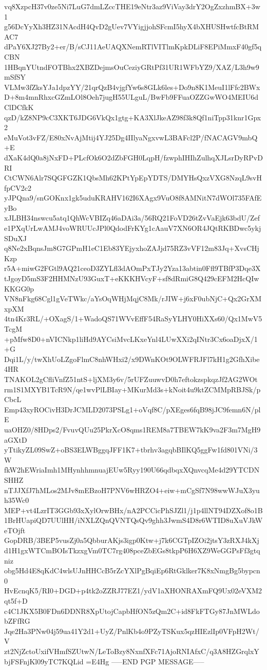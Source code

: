 vq8XzpcH37v0ze5Ni7LuG7dmLZccTHE19eNtr3az9ViVay3drY2OgZxzhmBX+3w1
g56DcYyXh3HZ31NAcdH4QvD2gUev7VYigjjohSFcmI5hyX4bXHUSHwtfcBtRMAC7
dPaY6XJ27By2+er/B/sCJ11AeUAQXNemRTlVITlmKpkDLiF8EPiMmxF40gf5qCBN
1HBqnYUtndFOTBhx2XBZDejmsOuCeziyGRtPf31UR1WFbYZ9/XAZ/L3h9w9mSfSY
VLMw3fZksYJa1dpzYY/21qrQzB4vjgfYw6s8GLk6les+Do9n8K1MeuI1lFfc2BWx
D+8m4mnRhxcGZmLOl8Oeh7jugH55ULguL/BwFb9FFuaOZZGwWO4MEIU6dClDCfkK
qzD/kZ8NP9cC3XKT6JDG6VkQx1gtg+KA3XlJkeAZ98f3k8Qf1niTpp31knr1Gpx2
eMuVot3vFZ/E80xNvAjMtij4YJ25Dg4IIlyaNgxvwL3BAFcl2P/fNACAGV9mbQ+E
dXaK4dQ0a8jNxFD+PLcfOk6O2dZbFGH0LqpH/fzwphIHIhZulhqXJLsrDyRPvDRI
CtCWN6Alr7SQGFGZK1QbsMh62KPtYpEpYDTS/DMYHsQxzVXG8NzqL9svHfpCV2c2
yJPQna9/snGOKnx1gk5uduKRAHV162I6XAgx9VuO8f8AMNitN7dWOl735FAfEyBo
xJLBH34nswcu5atq1QhWcVBIZq46aDAi3a/56RQ21FoVD26tZvVaEjk63bdU/Zef
e1PXqUrLwAMJ4voWRUUcJPl0QdodFrKYg1cAauV7XN6OR4JQtRKBDwc5ykjSDuXJ
q8Ne2xBqnsJm8G7GPmH1eC1Eb83YEjyxhoZAJjd75RZ3vVF12m83Jq+XvsCHjKzp
r5A+miwG2FGtl9AQ21ceoD3ZYLfl3dAOmPxTJy2Yza13abtin0Ffl9TBfP3Dqe3X
tJgoyD5mS3F2HHMNzU93GuxT+eKKKHVcyF+sf8dRmiG8Q429cEFM2HcQIwKKGG0p
VN8nFkg68Cgl1gVeTWkc/aYsOqWHjMqjC8Mk/rJIW+j6xF0ubNjC+Qx2GrXMxpXM
4tn4Kr3RL/+OXagS/1+WadoQS71WVvEffF54RaSyYLHY0HiXXs60/Qx1MwV5TcgM
+pMfw8D0+nVICNkp1liHd9AYCsiMvcLKxeYnl4LUwXXi2qINtr3Cx6oaDjxX/1+G
Dqi1L/y/twXhUoLZgoFlmC8nhWHxi2/x9DWnKOt9OLWFRJFl7kH1g2GfhXibe4HR
TNAKOL2gCfliVnfZ51ntS+ljXM3y6v/5rUFZuuwvD0h7eftokzspkqzJf2AG2WOt
rm1S1MXYB1TcR9N/qe1wvPlLBIay+MKurMd3s+kNoit4u9ktZCMMpRBJSk/pCbcL
Emp43xyROCivH3DrJCMLD2073PSLg1+oVqf8C/pXEges6fqB98jJC9femn6N/plE
uaOHZ0/8HDps2/FvuvQUu25PkrXcO8qms1REM8a7TBEW7kK9va2F3m7MgH9aGXtD
yTtikyZL09SwZ+oBS3ELWBggqJFF1K7+tbrhv3agqbBIlKQ5ggFw1fd801VNi/3W
fkW2hEWriaImh1MHynhhmnuajEUw5Ryy190U66qdbqxXQnvcqMe4d29YTCDNSHHZ
nTJJXfJ7hMLos2MJv8mEBzoH7PNV6wHRZO4+eiw+mCgSf7N98wwWJuX3yuh35Wc0
MEP+vt4LzrIT3GGb93xXylOrwBHx/nA2PCCicPhSJZl1/j1p4llNT94DZXof8o1B
1BrHUapiQD7UUlHH/iNXLZQnQVNTQsQv9ghh3JwmS4D8r6WTID8uXuVJkWeTOjft
GopDRB/3BEP5vusZj0a5QbburAKjs3igp0Ktw+j7k6CGTpIZOi2jtsY3zRXJ4kXj
d1H1gxWTCmBOIsTkzxgVm0TC7rg408pceZbEGs8tkpP6H6XZ9WeGGPsFf3gtqniz
obg5Hd4E8qKdC4wlsUJnHHCcB5rZcYXlPgBqiEp6RtGklker7K8xNmgBg5bypcn0
HvEcnqK5/RI0+DGD+p4tk2oZZRJ77EZ1/ydV1aXHONRAXmFQ9Ux02eVXM2qt5f+D
c4C1JKX5B0FDn6DDNR8XpUtojCapbHfON5zQm2C+id8FkFTGy87JnMWLdobZFfRG
Jqe2Ha3PNw04j59ua41Y2d1+UyZ/PnlKb4o9PZyTSKux5qzHIEzlIp0VFpH2Wt/V
zt2NjZctoUxifVHmfSZUtwN/LeToBzy8NxnfXFc71AjoRNIAfxC/q3A8HZGrqlxY
bjFSFnjKl09yTC7KQLid
=E4Hg
-----END PGP MESSAGE-----
